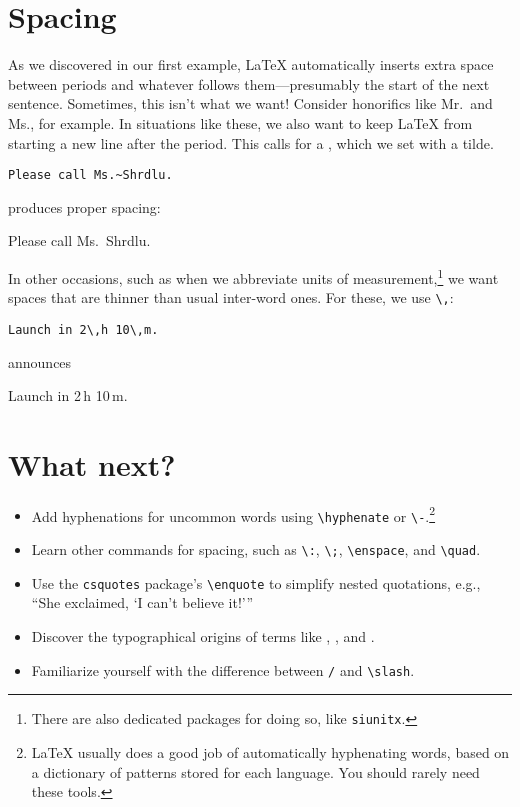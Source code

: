 \section{Spacing}

As we discovered in our first example,
\LaTeX{} automatically inserts extra space between periods and whatever
follows them---presumably the start of the next sentence.
Sometimes, this isn't what we want!
Consider honorifics like Mr.\ and Ms., for example.
In situations like these, we also want to keep \LaTeX{} from starting a new line
after the period.
This calls for a , which we set with a tilde.
\begin{leftfigure}
\begin{lstlisting}
Please call Ms.~Shrdlu.
\end{lstlisting}
\end{leftfigure}
produces proper spacing:
\begin{leftfigure}
\lm%
Please call Ms.~Shrdlu.
\end{leftfigure}

In other occasions, such as when we abbreviate units of
measurement,\punckern\footnote{There are also dedicated packages for doing so,
like \texttt{siunitx}.}
we want spaces that are thinner than usual inter-word ones.
For these, we use \verb|\,|:
\begin{leftfigure}
\begin{lstlisting}
Launch in 2\,h 10\,m.
\end{lstlisting}
\end{leftfigure}
announces
\begin{leftfigure}
\lm%
Launch in 2\,h 10\,m.
\end{leftfigure}

\section{What next?}
\begin{itemize}
\item Add hyphenations for uncommon words using \verb|\hyphenate|
    or \verb|\-|.\punckern\footnote{\LaTeX{} usually does a good
    job of automatically hyphenating words, based on a dictionary of patterns
    stored for each language. You should rarely need these tools.}
\item Learn other commands for spacing, such as \verb|\:|, \verb|\;|,
    \verb|\enspace|, and \verb|\quad|.
\item Use the \texttt{csquotes} package's \verb|\enquote| to simplify
    nested quotations, e.g., \\
    \enquote{She exclaimed, \enquote{I can't believe it!}}
\item Discover the typographical origins of terms like ,
    , and .
\item Familiarize yourself with the difference between \texttt{/} and
    \verb|\slash|.
\end{itemize}
